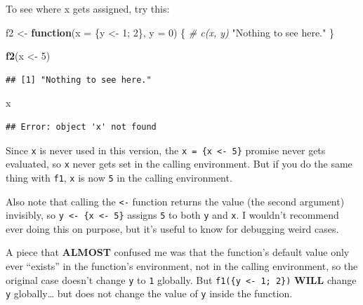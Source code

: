 \documentclass[]{book}
\newenvironment{Shaded}{\begin{snugshade}}{\end{snugshade}}
\newcommand{\CommentTok}[1]{\textcolor[rgb]{0.56,0.35,0.01}{\textit{#1}}}
\newcommand{\ControlFlowTok}[1]{\textcolor[rgb]{0.13,0.29,0.53}{\textbf{#1}}}
\newcommand{\DataTypeTok}[1]{\textcolor[rgb]{0.13,0.29,0.53}{#1}}
\newcommand{\DecValTok}[1]{\textcolor[rgb]{0.00,0.00,0.81}{#1}}
\newcommand{\KeywordTok}[1]{\textcolor[rgb]{0.13,0.29,0.53}{\textbf{#1}}}
\newcommand{\NormalTok}[1]{#1}
\newcommand{\StringTok}[1]{\textcolor[rgb]{0.31,0.60,0.02}{#1}}
\begin{document}
To see where x gets assigned, try this:

\begin{Shaded}
\begin{Highlighting}[]
\NormalTok{f2 <-}\StringTok{ }\ControlFlowTok{function}\NormalTok{(}\DataTypeTok{x =}\NormalTok{ \{y <-}\StringTok{ }\DecValTok{1}\NormalTok{; }\DecValTok{2}\NormalTok{\}, }\DataTypeTok{y =} \DecValTok{0}\NormalTok{) \{}
  \CommentTok{# c(x, y)}
  \StringTok{"Nothing to see here."}
\NormalTok{\}}
\end{Highlighting}
\end{Shaded}

\begin{Shaded}
\begin{Highlighting}[]
\KeywordTok{f2}\NormalTok{(x <-}\StringTok{ }\DecValTok{5}\NormalTok{)}
\end{Highlighting}
\end{Shaded}

\begin{verbatim}
## [1] "Nothing to see here."
\end{verbatim}

\begin{Shaded}
\begin{Highlighting}[]
\NormalTok{x}
\end{Highlighting}
\end{Shaded}

\begin{verbatim}
## Error: object 'x' not found
\end{verbatim}

Since \texttt{x} is never used in this version, the \texttt{x\ =\ \{x\ \textless{}-\ 5\}} promise never gets evaluated, so \texttt{x} never gets set in the calling environment. But if you do the same thing with \texttt{f1}, \texttt{x} is now \texttt{5} in the calling environment.

Also note that calling the \texttt{\textless{}-} function returns the value (the second argument) invisibly, so \texttt{y\ \textless{}-\ \{x\ \textless{}-\ 5\}} assigns \texttt{5} to both \texttt{y} and \texttt{x}. I wouldn't recommend ever doing this on purpose, but it's useful to know for debugging weird cases.

A piece that \textbf{ALMOST} confused me was that the function's default value only ever ``exists'' in the function's environment, not in the calling environment, so the original case doesn't change \texttt{y} to \texttt{1} globally. But \texttt{f1(\{y\ \textless{}-\ 1;\ 2\})} \textbf{WILL} change \texttt{y} globally\ldots{} but does not change the value of \texttt{y} inside the function.
\end{document}
